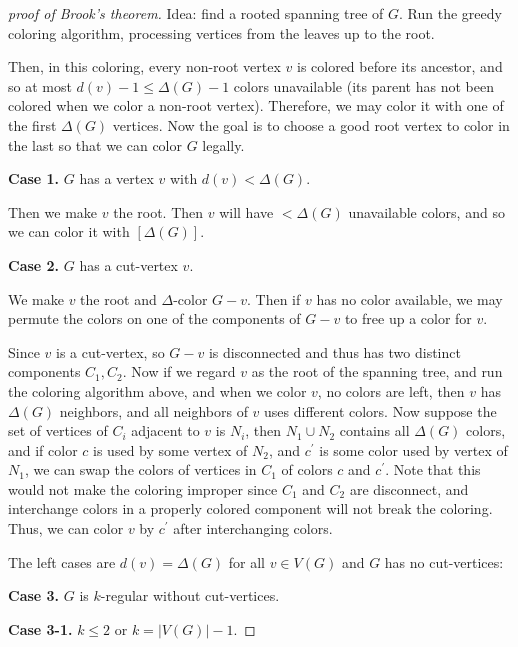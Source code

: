 \begin{proof}[proof of Brook's theorem]
    Idea: find a rooted spanning tree of $G$. Run the greedy coloring algorithm, processing vertices from the leaves up to the root.

    Then, in this coloring, every non-root vertex $v$ is colored before its ancestor, and so at most $d(v)-1 \le \Delta(G)-1$ colors unavailable (its parent has not been colored when we color a non-root vertex). Therefore, we may color it with one of the first $\Delta(G)$ vertices. Now the goal is to choose a good root vertex to color in the last so that we can color \(G\) legally. 

    {\bf Case 1.} $G$ has a vertex $v$ with $d(v)<\Delta(G)$.

    Then we make $v$ the root. Then $v$ will have $<\Delta(G)$ unavailable colors, and so we can color it with $[\Delta(G)]$.

    {\bf Case 2.} $G$ has a cut-vertex $v$.

    We make $v$ the root and $\Delta$-color $G-v$. Then if $v$ has no color available, we may permute the colors on one of the components of $G-v$ to free up a color for $v$.

    \begin{remark}
        Since \(v\) is a cut-vertex, so \(G - v\) is disconnected and thus has two distinct components \(C_1, C_2\). Now if we regard \(v\) as the root of the spanning tree, and run the coloring algorithm above, and when we color \(v\), no colors are left, then \(v\) has \(\Delta (G)\) neighbors, and all neighbors of \(v\) uses different colors. Now suppose the set of vertices of \(C_i\) adjacent to \(v\) is \(N_i\), then \(N_1 \cup N_2\) contains all \(\Delta (G)\) colors, and if color \(c\) is used by some vertex of \(N_2\), and \(c^{\prime} \) is some color used by vertex of \(N_1\), we can swap the colors of vertices in \(C_1\) of colors \(c\) and \(c^{\prime}\). Note that this would not make the coloring improper since \(C_1\) and \(C_2\) are disconnect, and interchange colors in a properly colored component will not break the coloring. Thus, we can color \(v\) by \(c^{\prime}\) after interchanging colors.                     
    \end{remark}

    The left cases are \(d(v) = \Delta (G)\) for all \(v \in V(G)\) and \(G\) has no cut-vertices:   

    {\bf Case 3.} $G$ is $k$-regular without cut-vertices.

    {\bf Case 3-1.} $k \le 2$ or $k=|V(G)|-1$.


\end{proof}

